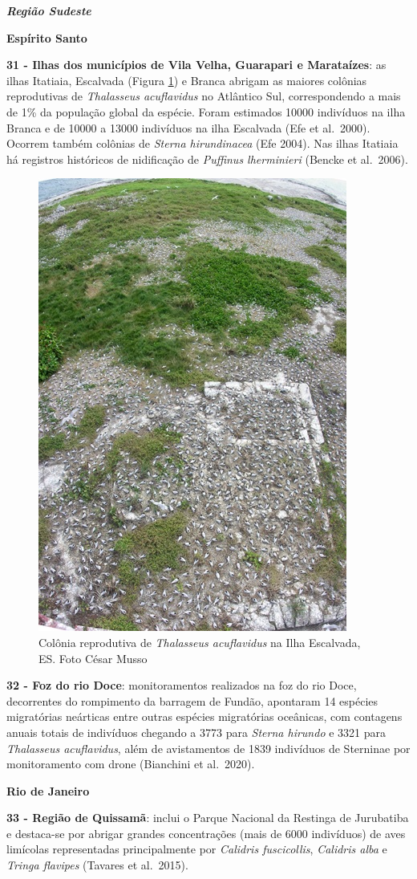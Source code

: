 \documentclass[
  oneside]{scrbook}
\begin{document}
\textbf{\emph{Região Sudeste}}

\textbf{Espírito Santo}

\textbf{31 - Ilhas dos municípios de Vila Velha, Guarapari e Marataízes}: as ilhas Itatiaia, Escalvada (Figura \ref{fig:25}) e Branca abrigam as maiores colônias reprodutivas de \emph{Thalasseus acuflavidus} no Atlântico Sul, correspondendo a mais de 1\% da população global da espécie. Foram estimados 10000 indivíduos na ilha Branca e de 10000 a 13000 indivíduos na ilha Escalvada (Efe et al.~2000). Ocorrem também colônias de \emph{Sterna hirundinacea} (Efe 2004). Nas ilhas Itatiaia há registros históricos de nidificação de \emph{Puffinus lherminieri} (Bencke et al.~2006).

\begin{figure}[H]

{\centering \includegraphics[width=0.4\linewidth]{imagens/cap07/Figura_7.5} 

}

\caption{Colônia reprodutiva de \emph{Thalasseus acuflavidus} na Ilha Escalvada, ES. Foto César Musso}\label{fig:25}
\end{figure}



\textbf{32 - Foz do rio Doce}: monitoramentos realizados na foz do rio Doce, decorrentes do rompimento da barragem de Fundão, apontaram 14 espécies migratórias neárticas entre outras espécies migratórias oceânicas, com contagens anuais totais de indivíduos chegando a 3773 para \emph{Sterna hirundo} e 3321 para \emph{Thalasseus acuflavidus}, além de avistamentos de 1839 indivíduos de Sterninae por monitoramento com drone (Bianchini et al.~2020).

\textbf{Rio de Janeiro}

\textbf{33 - Região de Quissamã}: inclui o Parque Nacional da Restinga de Jurubatiba e destaca-se por abrigar grandes concentrações (mais de 6000 indivíduos) de aves limícolas representadas principalmente por \emph{Calidris fuscicollis}, \emph{Calidris alba} e \emph{Tringa flavipes} (Tavares et al.~2015).
\end{document}
